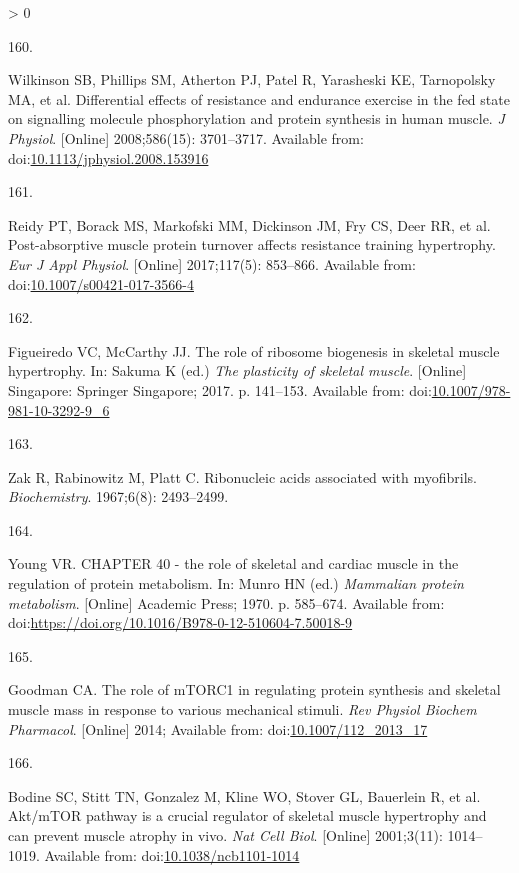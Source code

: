 \documentclass[twoside,10pt]{gihclass} %
\newlength{\cslhangindent}
\newlength{\csllabelwidth}
\newenvironment{CSLReferences}[3] %
 {%
  \setlength{\parindent}{0pt}
  \ifodd #1 \everypar{\setlength{\hangindent}{\cslhangindent}}\ignorespaces\fi
  \ifnum #2 > 0
  \setlength{\parskip}{#2\baselineskip}
  \fi
 }%
 {}
\newcommand{\CSLLeftMargin}[1]{\parbox[t]{\maxof{\widthof{#1}}{\csllabelwidth}}{#1}}
\newcommand{\CSLRightInline}[1]{\parbox[t]{\linewidth}{#1}}
\begin{document}
\begin{CSLReferences}{0}{0}
\leavevmode\hypertarget{ref-RN1866}{}%
\CSLLeftMargin{160. }
\CSLRightInline{Wilkinson SB, Phillips SM, Atherton PJ, Patel R, Yarasheski KE, Tarnopolsky MA, et al. Differential effects of resistance and endurance exercise in the fed state on signalling molecule phosphorylation and protein synthesis in human muscle. \emph{J Physiol}. {[}Online{]} 2008;586(15): 3701--3717. Available from: doi:\href{https://doi.org/10.1113/jphysiol.2008.153916}{10.1113/jphysiol.2008.153916}}

\leavevmode\hypertarget{ref-RN1897}{}%
\CSLLeftMargin{161. }
\CSLRightInline{Reidy PT, Borack MS, Markofski MM, Dickinson JM, Fry CS, Deer RR, et al. Post-absorptive muscle protein turnover affects resistance training hypertrophy. \emph{Eur J Appl Physiol}. {[}Online{]} 2017;117(5): 853--866. Available from: doi:\href{https://doi.org/10.1007/s00421-017-3566-4}{10.1007/s00421-017-3566-4}}

\leavevmode\hypertarget{ref-RN1912}{}%
\CSLLeftMargin{162. }
\CSLRightInline{Figueiredo VC, McCarthy JJ. The role of ribosome biogenesis in skeletal muscle hypertrophy. In: Sakuma K (ed.) \emph{The plasticity of skeletal muscle}. {[}Online{]} Singapore: Springer Singapore; 2017. p. 141--153. Available from: doi:\href{https://doi.org/10.1007/978-981-10-3292-9_6}{10.1007/978-981-10-3292-9\_6}}

\leavevmode\hypertarget{ref-RN2054}{}%
\CSLLeftMargin{163. }
\CSLRightInline{Zak R, Rabinowitz M, Platt C. Ribonucleic acids associated with myofibrils. \emph{Biochemistry}. 1967;6(8): 2493--2499. }

\leavevmode\hypertarget{ref-RN2223}{}%
\CSLLeftMargin{164. }
\CSLRightInline{Young VR. CHAPTER 40 - the role of skeletal and cardiac muscle in the regulation of protein metabolism. In: Munro HN (ed.) \emph{Mammalian protein metabolism}. {[}Online{]} Academic Press; 1970. p. 585--674. Available from: doi:\url{https://doi.org/10.1016/B978-0-12-510604-7.50018-9}}

\leavevmode\hypertarget{ref-RN1049}{}%
\CSLLeftMargin{165. }
\CSLRightInline{Goodman CA. The role of mTORC1 in regulating protein synthesis and skeletal muscle mass in response to various mechanical stimuli. \emph{Rev Physiol Biochem Pharmacol}. {[}Online{]} 2014; Available from: doi:\href{https://doi.org/10.1007/112_2013_17}{10.1007/112\_2013\_17}}

\leavevmode\hypertarget{ref-RN782}{}%
\CSLLeftMargin{166. }
\CSLRightInline{Bodine SC, Stitt TN, Gonzalez M, Kline WO, Stover GL, Bauerlein R, et al. Akt/mTOR pathway is a crucial regulator of skeletal muscle hypertrophy and can prevent muscle atrophy in vivo. \emph{Nat Cell Biol}. {[}Online{]} 2001;3(11): 1014--1019. Available from: doi:\href{https://doi.org/10.1038/ncb1101-1014}{10.1038/ncb1101-1014}}


\end{CSLReferences}
\end{document}
